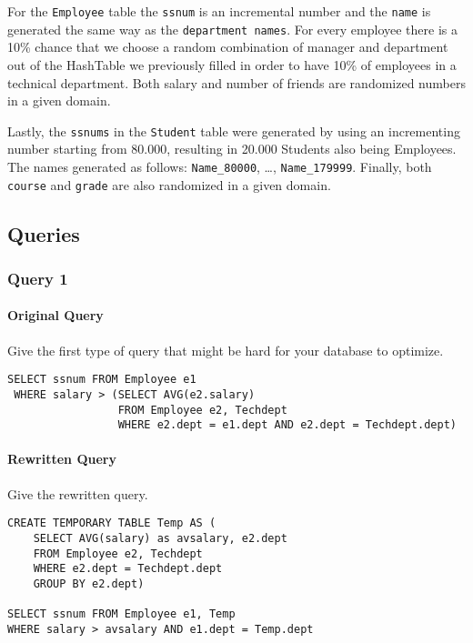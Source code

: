 \documentclass[11pt]{scrartcl}
\begin{document}
    For the \texttt{Employee} table the \texttt{ssnum} is an incremental number and the \texttt{name} is generated the same way as the \texttt{department names}.
    For every employee there is a 10\% chance that we choose a random combination of manager and department out of the HashTable we previously filled in order to have 10\% of employees in a technical department.
    Both salary and number of friends are randomized numbers in a given domain.

    Lastly, the \texttt{ssnums} in the \texttt{Student} table were generated by using an incrementing number starting from 80.000, resulting in 20.000 Students also being Employees. The names generated as follows: \texttt{Name\_80000}, \dots , \texttt{Name\_179999}. Finally, both \texttt{course} and \texttt{grade} are also randomized in a given domain.
    

    
    \subsection*{Queries}

    \subsubsection*{Query 1}

    \paragraph{Original Query}

    Give the first type of query that might be hard for your database to optimize.

    \begin{lstlisting}[style=dbtsql]
 SELECT ssnum FROM Employee e1 
 WHERE salary > (SELECT AVG(e2.salary) 
                 FROM Employee e2, Techdept 
                 WHERE e2.dept = e1.dept AND e2.dept = Techdept.dept)
    \end{lstlisting}

    \paragraph{Rewritten Query}

    Give the rewritten query.

    \begin{lstlisting}[style=dbtsql]
CREATE TEMPORARY TABLE Temp AS (
    SELECT AVG(salary) as avsalary, e2.dept 
    FROM Employee e2, Techdept 
    WHERE e2.dept = Techdept.dept 
    GROUP BY e2.dept)

SELECT ssnum FROM Employee e1, Temp 
WHERE salary > avsalary AND e1.dept = Temp.dept
    \end{lstlisting}
\end{document}
